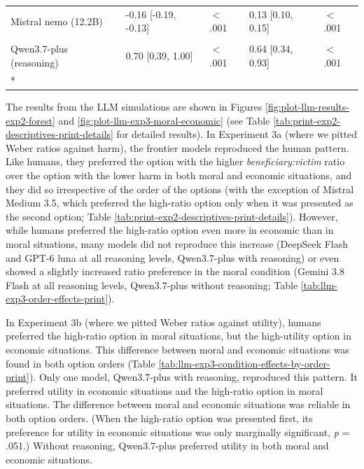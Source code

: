 \documentclass[
]{article}
\begin{document}
\begin{longtable}[t]{lllll}
\hspace{1em}Mistral nemo (12.2B) & -0.16 [-0.19, -0.13] & $<$.001 & 0.13 [0.10, 0.15] & $<$.001\\
\cellcolor{gray!10}{\hspace{1em}Qwen3.7-plus (no reasoning)} & \cellcolor{gray!10}{0.02 [-0.37, 0.40]} & \cellcolor{gray!10}{0.935} & \cellcolor{gray!10}{0.16 [-0.17, 0.49]} & \cellcolor{gray!10}{0.345}\\
\hspace{1em}Qwen3.7-plus (reasoning) & 0.70 [0.39, 1.00] & $<$.001 & 0.64 [0.34, 0.93] & $<$.001\\*
\end{longtable}
\endgroup{}

The results from the LLM simulations are shown in Figures \ref{fig:plot-llm-results-exp2-forest} and \ref{fig:plot-llm-exp3-moral-economic} (see Table \ref{tab:print-exp2-descriptives-print-details} for detailed results). In Experiment 3a (where we pitted Weber ratios against harm), the frontier models reproduced the human pattern. Like humans, they preferred the option with the higher \emph{beneficiary:victim} ratio over the option with the lower harm in both moral and economic situations, and they did so irrespective of the order of the options (with the exception of Mistral Medium 3.5, which preferred the high-ratio option only when it was presented as the second option; Table \ref{tab:print-exp2-descriptives-print-details}). However, while humans preferred the high-ratio option even more in economic than in moral situations, many models did not reproduce this increase (DeepSeek Flash and GPT-6 luna at all reasoning levels, Qwen3.7-plus with reasoning) or even showed a slightly increased ratio preference in the moral condition (Gemini 3.8 Flash at all reasoning levels, Qwen3.7-plus without reasoning; Table \ref{tab:llm-exp3-order-effects-print}).

In Experiment 3b (where we pitted Weber ratios against utility), humans preferred the high-ratio option in moral situations, but the high-utility option in economic situations. This difference between moral and economic situations was found in both option orders (Table \ref{tab:llm-exp3-condition-effects-by-order-print}). Only one model, Qwen3.7-plus with reasoning, reproduced this pattern. It preferred utility in economic situations and the high-ratio option in moral situations. The difference between moral and economic situations was reliable in both option orders. (When the high-ratio option was presented first, its preference for utility in economic situations was only marginally significant, \emph{p} = .051.) Without reasoning, Qwen3.7-plus preferred utility in both moral and economic situations.
\end{document}
